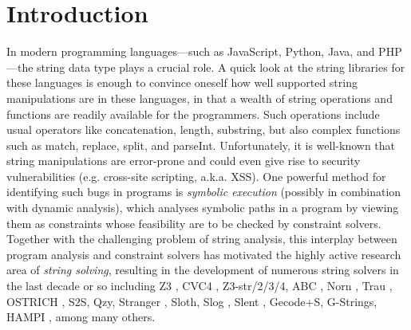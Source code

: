 
\section{Introduction}\label{sec-intro}



%
In modern programming languages---such as JavaScript, Python, Java, and PHP---the string data type plays a crucial role. 
A quick look at the string libraries for these languages is enough to convince
oneself how well supported string manipulations are in these languages, in that
a wealth of string operations and functions are readily available for the
programmers.
Such operations include usual operators like concatenation, length, substring, 
but also complex functions such as 
match, replace, split, and parseInt.
Unfortunately, it is well-known that string manipulations are error-prone and
could even give rise to
security vulnerabilities (e.g. cross-site scripting, a.k.a. XSS).
One powerful method for identifying such bugs in programs is \emph{symbolic 
execution} (possibly in combination with dynamic analysis), which
analyses symbolic paths in a program by viewing them as constraints %
whose feasibility are to be checked by constraint solvers. 
Together with the challenging problem of string analysis,
this interplay between program analysis and constraint solvers has motivated 
the highly active research area of \emph{string solving}, resulting in the
development of numerous string solvers in the last decade or so including
Z3 \cite{Z3}, CVC4 \cite{cvc4}, Z3-str/2/3/4, ABC \cite{ABC}, Norn
\cite{Abdulla14}, Trau \cite{Z3-trau,AbdullaACDHRR18-trau,Abdulla17}, OSTRICH
\cite{CHL+19}, S2S, Qzy, Stranger \cite{Stranger}, Sloth,
Slog \cite{fang-yu-circuits}, Slent \cite{WC+18}, Gecode+S, G-Strings, HAMPI
\cite{HAMPI}, among many others. %

